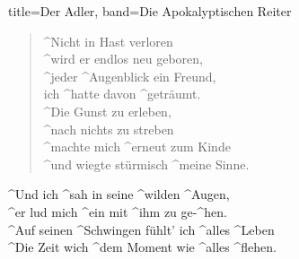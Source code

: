 \begin{song}{title=Der Adler, band=Die Apokalyptischen Reiter}
\begin{multicols}{2}
        \columnbreak

        \begin{verse}
            ^Nicht in Hast verloren \\
            ^wird er endlos neu geboren, \\
            ^jeder ^Augenblick ein Freund, \\
            ich ^hatte davon ^geträumt. \\
            ^Die Gunst zu erleben, \\
            ^nach nichts zu streben \\
            ^machte mich ^erneut zum Kinde \\
            ^und wiegte stürmisch ^meine Sinne.
        \end{verse}

        \begin{chorus}
            ^Und ich ^sah in seine ^wilden ^Augen, \\
            ^er lud mich ^ein mit ^ihm zu ge-^hen. \\
            ^Auf seinen ^Schwingen fühlt' ich ^alles ^Leben \\
            ^Die Zeit wich ^dem Moment wie ^alles ^flehen.
        \end{chorus}
    \end{multicols}
\end{song}
